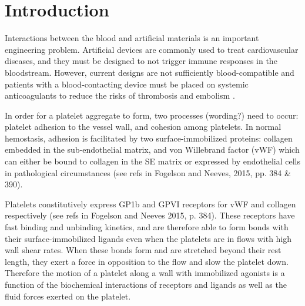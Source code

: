 
\chapter{Introduction}
\label{cha:introduction}


Interactions between the blood and artificial materials is an
important engineering problem. Artificial devices are commonly used to
treat cardiovascular diseases, and they must be designed to not
trigger immune responses in the bloodstream. However, current designs
are not sufficiently blood-compatible and patients with a
blood-contacting device must be placed on systemic anticoagulants to
reduce the risks of thrombosis and embolism
\cite{Ratner1993,Ratner2007,Oprea13}.
	
In order for a platelet aggregate to form, two processes (wording?)
need to occur: platelet adhesion to the vessel wall, and cohesion
among platelets. In normal hemostasis, adhesion is facilitated by two
surface-immobilized proteins: collagen embedded in the sub-endothelial
matrix, and von Willebrand factor (vWF) which can either be bound to
collagen in the SE matrix or expressed by endothelial cells in
pathological circumstances (see refs in Fogelson and Neeves, 2015,
pp. 384 \& 390).
		
Platelets constitutively express GP1b and GPVI receptors for vWF and
collagen respectively (see refs in Fogelson and Neeves 2015,
p. 384). These receptors have fast binding and unbinding kinetics, and
are therefore able to form bonds with their surface-immobilized
ligands even when the platelets are in flows with high wall shear
rates. When these bonds form and are stretched beyond their rest
length, they exert a force in opposition to the flow and slow the
platelet down. Therefore the motion of a platelet along a wall with
immobilized agonists is a function of the biochemical interactions of
receptors and ligands as well as the fluid forces exerted on the
platelet.
		
